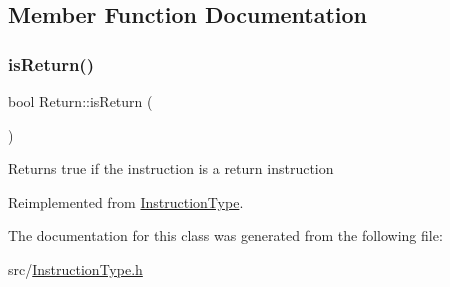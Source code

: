 \subsection{Member Function Documentation}
\mbox{\label{classReturn_ad3412361560f4acdb1e4f73ab65d3bc7}} 
\subsubsection{\texorpdfstring{is\+Return()}{isReturn()}}
{\footnotesize\ttfamily bool Return\+::is\+Return (\begin{DoxyParamCaption}{ }\end{DoxyParamCaption})\hspace{0.3cm}{\ttfamily [virtual]}}

Returns true if the instruction is a return instruction 

Reimplemented from \hyperlink{classInstructionType_a15b0f034f3536f0bc525550406e1d7c6}{Instruction\+Type}.



The documentation for this class was generated from the following file\+:\begin{DoxyCompactItemize}
\item 
src/\hyperlink{InstructionType_8h}{Instruction\+Type.\+h}\end{DoxyCompactItemize}

